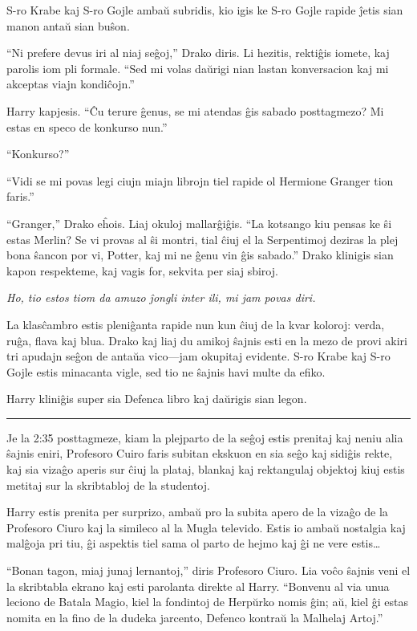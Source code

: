 S-ro Krabe kaj S-ro Gojle ambaŭ subridis, kio igis ke S-ro Gojle
rapide ĵetis sian manon antaŭ sian buŝon.

``Ni prefere devus iri al niaj seĝoj,'' Drako diris. Li hezitis,
rektiĝis iomete, kaj parolis iom pli formale. ``Sed mi volas daŭrigi
nian lastan konversacion kaj mi akceptas viajn kondiĉojn.''

Harry kapjesis. ``Ĉu terure ĝenus, se mi atendas ĝis sabado
posttagmezo? Mi estas en speco de konkurso nun.''

``Konkurso?''

``Vidi se mi povas legi ciujn miajn librojn tiel rapide ol Hermione Granger tion faris.''

``Granger,'' Drako eĥois. Liaj okuloj mallarĝiĝis. ``La kotsango kiu
pensas ke ŝi estas Merlin? Se vi provas al ŝi montri, tial ĉiuj el la
Serpentimoj deziras la plej bona ŝancon por vi, Potter, kaj mi ne ĝenu
vin ĝis sabado.'' Drako klinigis sian kapon respekteme, kaj vagis for,
sekvita per siaj sbiroj.

\emph{Ho, tio estos tiom da amuzo ĵongli inter ili, mi jam povas diri.}

La klasĉambro estis pleniĝanta rapide nun kun ĉiuj de la kvar koloroj:
verda, ruĝa, flava kaj blua. Drako kaj liaj du amikoj ŝajnis esti en
la mezo de provi akiri tri apudajn seĝon de antaŭa vico—jam okupitaj
evidente. S-ro Krabe kaj S-ro Gojle estis minacanta vigle, sed tio ne
ŝajnis havi multe da efiko.

Harry kliniĝis super sia Defenca libro kaj daŭrigis sian legon.

\begin{center}\rule{3in}{0.4pt}\end{center}

Je la 2:35 posttagmeze, kiam la plejparto de la seĝoj estis prenitaj
kaj neniu alia ŝajnis eniri, Profesoro Cuiro faris subitan ekskuon en
sia seĝo kaj sidiĝis rekte, kaj sia vizaĝo aperis sur ĉiuj la plataj,
blankaj kaj rektangulaj objektoj kiuj estis metitaj sur la skribtabloj
de la studentoj.

Harry estis prenita per surprizo, ambaŭ pro la subita apero de la
vizaĝo de la Profesoro Ciuro kaj la simileco al la Mugla
televido. Estis io ambaŭ nostalgia kaj malĝoja pri tiu, ĝi aspektis
tiel sama ol parto de hejmo kaj ĝi ne vere estis\ldots

``Bonan tagon, miaj junaj lernantoj,'' diris Profesoro Ciuro. Lia voĉo
ŝajnis veni el la skribtabla ekrano kaj esti parolanta direkte al
Harry. ``Bonvenu al via unua leciono de Batala Magio, kiel la
fondintoj de Herpŭrko nomis ĝin; aŭ, kiel ĝi estas nomita en la fino
de la dudeka jarcento, Defenco kontraŭ la Malhelaj Artoj.''

